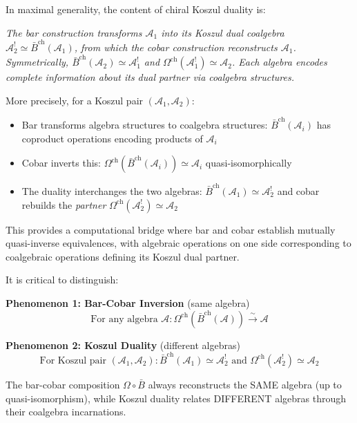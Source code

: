 \begin{remark}[Slogan]\label{rem:koszul-slogan-corrected}
In maximal generality, the content of chiral Koszul duality is:
\begin{center}
\textit{The bar construction transforms $\mathcal{A}_1$ into its Koszul dual coalgebra $\mathcal{A}_2^! \simeq \bar{B}^{\text{ch}}(\mathcal{A}_1)$, from which the cobar construction reconstructs $\mathcal{A}_1$. Symmetrically, $\bar{B}^{\text{ch}}(\mathcal{A}_2) \simeq \mathcal{A}_1^!$ and $\Omega^{\text{ch}}(\mathcal{A}_1^!) \simeq \mathcal{A}_2$. Each algebra encodes complete information about its dual partner via coalgebra structures.}
\end{center}

More precisely, for a Koszul pair $(\mathcal{A}_1, \mathcal{A}_2)$:
\begin{itemize}
\item Bar transforms algebra structures to coalgebra structures: $\bar{B}^{\text{ch}}(\mathcal{A}_i)$ has coproduct operations encoding products of $\mathcal{A}_i$
\item Cobar inverts this: $\Omega^{\text{ch}}(\bar{B}^{\text{ch}}(\mathcal{A}_i)) \simeq \mathcal{A}_i$ quasi-isomorphically
\item The duality interchanges the two algebras: $\bar{B}^{\text{ch}}(\mathcal{A}_1) \simeq \mathcal{A}_2^!$ and cobar rebuilds the \emph{partner} $\Omega^{\text{ch}}(\mathcal{A}_2^!) \simeq \mathcal{A}_2$
\end{itemize}

This provides a computational bridge where bar and cobar establish mutually quasi-inverse equivalences, with algebraic operations on one side corresponding to coalgebraic operations defining its Koszul dual partner.
\end{remark}

\begin{remark}
It is critical to distinguish:

\textbf{Phenomenon 1: Bar-Cobar Inversion} (same algebra)
$$\text{For any algebra } \mathcal{A}: \Omega^{\text{ch}}(\bar{B}^{\text{ch}}(\mathcal{A})) \xrightarrow{\sim} \mathcal{A}$$

\textbf{Phenomenon 2: Koszul Duality} (different algebras)
$$\text{For Koszul pair } (\mathcal{A}_1, \mathcal{A}_2): \bar{B}^{\text{ch}}(\mathcal{A}_1) \simeq \mathcal{A}_2^! \text{ and } \Omega^{\text{ch}}(\mathcal{A}_2^!) \simeq \mathcal{A}_2$$

The bar-cobar composition $\Omega \circ \bar{B}$ always reconstructs the SAME algebra (up to quasi-isomorphism), while Koszul duality relates DIFFERENT algebras through their coalgebra incarnations.
\end{remark}

